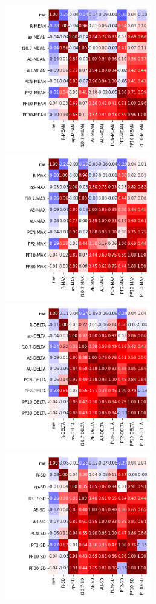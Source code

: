 \documentclass[12pt]{article}
\begin{document}
\newpage

\begin{figure}
   \includegraphics[width=0.57\textwidth]{eight-nine_mean_3.png}
   \includegraphics[width=0.57\textwidth]{eight-nine_max_3.png}
   \includegraphics[width=0.57\textwidth]{eight-nine_delta_3.png}
   \includegraphics[width=0.57\textwidth]{eight-nine_sd_3.png}
\end{figure}

\newpage
\end{document}
